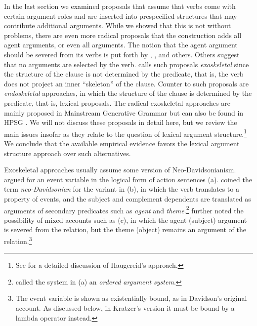 In the last section we examined proposals that assume that verbs come with certain argument roles
and are inserted into prespecified structures that may contribute additional arguments. While we
showed that this is not without problems, there are even more radical proposals that the
construction adds all agent arguments, or even all arguments.  The notion that the agent argument
should be severed from its verbs is put forth by \citet{Marantz84a, Marantz97a}, \citet{Kratzer96a},
\citet{Embick2004a} and others.  Others suggest that no arguments are selected by the verb.
\citet{Borer2003a-u} calls such proposals \emph{exoskeletal} since the structure of the clause is
not determined by the predicate, that is, the verb does not project an inner ``skeleton'' of the
clause.  Counter to such proposals are \emph{endoskeletal} approaches, in which the structure of the
clause is determined by the predicate, that is, lexical proposals.  The radical exoskeletal
approaches are mainly proposed in Mainstream Generative Grammar
\citep{Borer94a-u,Borer2003a-u,Borer2005a-u,Schein93a-u,HK97a-u,Lohndal2012a} but can also be found
in HPSG \citep{Haugereid2009a}.  We will not discuss these proposals in detail here, but we review
the main issues insofar as they relate to the question of lexical argument structure.\footnote{%
  See  for a detailed discussion of Haugereid's approach.%
} We conclude that the available empirical evidence favors the lexical argument structure approach over such
alternatives.

Exoskeletal approaches usually assume some version of Neo-Davidsonianism. \citet{Davidson67a-u}
argued for an event variable in the logical form of action sentences (a).
\citet{Dowty89b-u} coined the term \emph{neo-Davidsonian} for the variant in (b), in which
the verb translates to a property of events, and the subject and complement dependents are
translated as arguments of secondary predicates such as \emph{agent} and
\emph{theme}.\footnote{%
\citet{Dowty89b-u} called the system in (a) an \emph{ordered argument system}.
} \citet{Kratzer96a} further noted the possibility of mixed accounts such as (c),
in which the agent (subject) argument is severed from the  relation, but the theme (object) remains an
argument of the  relation.\footnote{%
  The event variable is shown as existentially bound, as in Davidson's original account.  
  As discussed below, in Kratzer's version it must be bound by a lambda operator instead.} 

